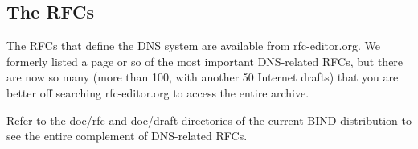 \protect\hypertarget{part0024_split_076.html}{}{}

\hypertarget{part0024_split_076.htmlux5cux23_idContainer1069}{}
\hypertarget{part0024_split_076.htmlux5cux23calibre_pb_75}{%
\subsection[The
RFCs]{\texorpdfstring{\protect\hypertarget{part0024_split_076.htmlux5cux23_idTextAnchor970}{}{}The
RFCs}{The RFCs}}\label{part0024_split_076.htmlux5cux23calibre_pb_75}}

The RFCs that define the DNS system are available from rfc-editor.org.
We formerly listed a page or so of the most important DNS-related RFCs,
but there are now so many (more than 100, with another 50 Internet
drafts) that you are better off searching rfc-editor.org to access the
entire archive.

Refer to the {doc/rfc} and {doc/draft} directories of the current BIND
distribution to see the entire complement of DNS-related RFCs.
